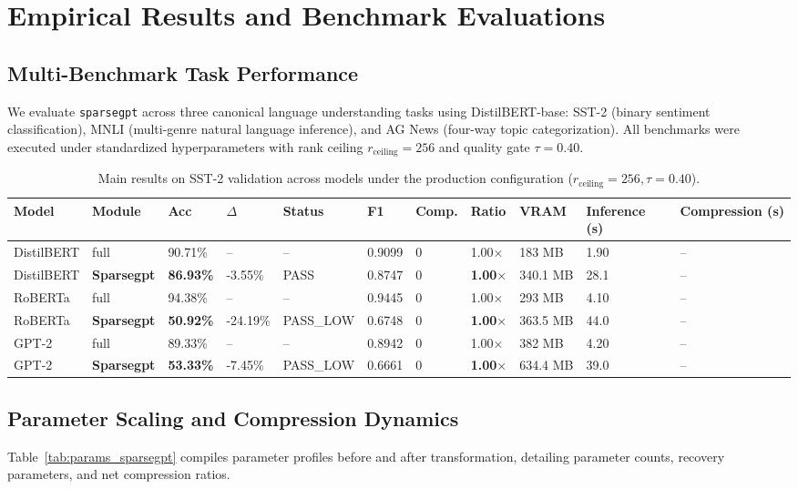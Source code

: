 \section{Empirical Results and Benchmark Evaluations}
\label{sec:results}

\subsection{Multi-Benchmark Task Performance}
We evaluate \texttt{sparsegpt} across three canonical language understanding tasks using DistilBERT-base: SST-2 (binary sentiment classification), MNLI (multi-genre natural language inference), and AG News (four-way topic categorization). All benchmarks were executed under standardized hyperparameters with rank ceiling $r_{\mathrm{ceiling}} = 256$ and quality gate $\tau = 0.40$.

\begin{table}[t]
\centering
\small
\begin{tabular}{lllllllllll}
\toprule
\textbf{Model} & \textbf{Module} & \textbf{Acc} & \textbf{$\Delta$} & \textbf{Status} & \textbf{F1} & \textbf{Comp.} & \textbf{Ratio} & \textbf{VRAM} & \textbf{Inference (s)} & \textbf{Compression (s)} \\
\midrule
DistilBERT & full & 90.71\% & -- & -- & 0.9099 & 0 & 1.00$\times$ & 183 MB & 1.90 & -- \\
DistilBERT & \textbf{Sparsegpt} & \textbf{86.93\%} & -3.55\% & PASS & 0.8747 & 0 & \textbf{1.00$\times$} & 340.1 MB & 28.1 & -- \\
RoBERTa & full & 94.38\% & -- & -- & 0.9445 & 0 & 1.00$\times$ & 293 MB & 4.10 & -- \\
RoBERTa & \textbf{Sparsegpt} & \textbf{50.92\%} & -24.19\% & PASS_LOW & 0.6748 & 0 & \textbf{1.00$\times$} & 363.5 MB & 44.0 & -- \\
GPT-2 & full & 89.33\% & -- & -- & 0.8942 & 0 & 1.00$\times$ & 382 MB & 4.20 & -- \\
GPT-2 & \textbf{Sparsegpt} & \textbf{53.33\%} & -7.45\% & PASS_LOW & 0.6661 & 0 & \textbf{1.00$\times$} & 634.4 MB & 39.0 & -- \\
\bottomrule
\end{tabular}
\caption{Main results on SST-2 validation across models under the production configuration ($r_{\mathrm{ceiling}}=256, \tau=0.40$).}
\label{tab:main_sst2}
\end{table}

\subsection{Parameter Scaling and Compression Dynamics}
Table~\ref{tab:params_sparsegpt} compiles parameter profiles before and after transformation, detailing parameter counts, recovery parameters, and net compression ratios.

